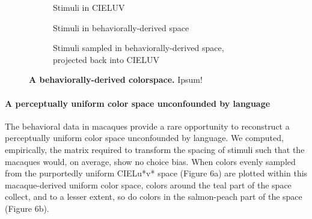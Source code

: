 \begin{figure}[t!] %
    \centering
    \begin{subfigure}[b]{0.3\textwidth}
         \centering
         \caption{Stimuli in CIELUV \newline\newline}
         
         \label{fig:CIELUV}
    \end{subfigure}
    \hfill
    \begin{subfigure}[b]{0.3\textwidth}
         \centering
         \caption{Stimuli in behaviorally-derived space \newline}
         
         \label{fig:MACBEHspace}
    \end{subfigure}
    \hfill
    \begin{subfigure}[b]{0.3\textwidth}
         \centering
         \caption{Stimuli sampled in behaviorally-derived space, projected back into CIELUV}
         
         \label{fig:UniformStimsInCIELUV}
    \end{subfigure}
           \caption{\textbf{A behaviorally-derived colorspace.} Ipsum!}
        \label{fig:MACBEHcolorspace}
    
\end{figure}


\paragraph{A perceptually uniform color space unconfounded by language}
The behavioral data in macaques provide a rare opportunity to reconstruct a perceptually uniform color space unconfounded by language. We computed, empirically, the matrix required to transform the spacing of stimuli such that the macaques would, on average, show no choice bias. When colors evenly sampled from the purportedly uniform CIELu*v* space (Figure 6a) are plotted within this macaque-derived uniform color space, colors around the teal part of the space collect, and to a lesser extent, so do colors in the salmon-peach part of the space (Figure 6b). 

